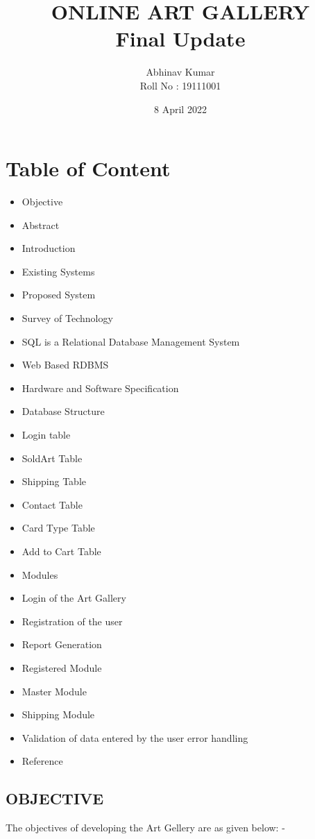 \documentclass{article}
\title{ONLINE ART GALLERY \\ Final Update}
\date{8 April 2022}
\author{Abhinav Kumar \\ Roll No : 19111001 }
\begin{document}
\maketitle
\section*{\textbf{Table of Content}}
\begin{itemize}
    \item Objective
 \item Abstract
 \item Introduction
 \item Existing Systems
 \item Proposed System 
 \item Survey of Technology
 \item SQL is a Relational Database Management System
 \item Web Based RDBMS
 \item Hardware and Software Specification
 \item Database Structure
 \item Login table
 \item SoldArt Table
 \item Shipping Table
 \item Contact Table
 \item Card Type Table
 \item Add to Cart Table
\item Modules
\item Login of the Art Gallery
\item Registration of the user
\item Report Generation
\item Registered Module
\item Master Module
\item Shipping Module
\item Validation of data entered by the user error handling
\item Reference
\end{itemize}
\begin{center}
   \section*{\textbf{OBJECTIVE}} 
\end{center}
The objectives of developing the Art Gellery are as given below: -
\\
\end{document}
